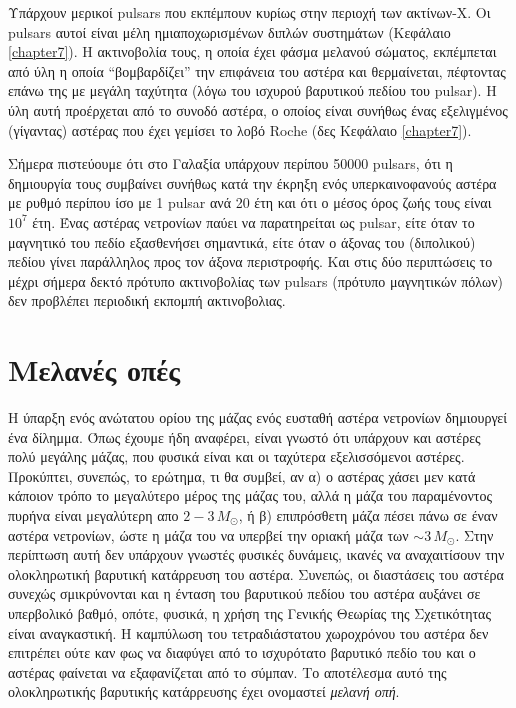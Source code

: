Υπάρχουν μερικοί pulsars που εκπέμπουν κυρίως στην περιοχή των ακτίνων-X. Οι pulsars αυτοί είναι μέλη ημιαποχωρισμένων διπλών συστημάτων (Κεφάλαιο \ref{chapter7}). Η ακτινοβολία τους, η οποία έχει φάσμα μελανού σώματος, εκπέμπεται από ύλη η οποία ``βομβαρδίζει'' την επιφάνεια του αστέρα και θερμαίνεται, πέφτοντας επάνω της με μεγάλη ταχύτητα (λόγω του ισχυρού βαρυτικού πεδίου του pulsar). Η ύλη αυτή προέρχεται από το συνοδό αστέρα, ο οποίος είναι συνήθως ένας εξελιγμένος (γίγαντας) αστέρας που έχει γεμίσει το λοβό Roche (δες Κεφάλαιο \ref{chapter7}).

Σήμερα πιστεύουμε ότι στο Γαλαξία υπάρχουν περίπου 50000 pulsars, ότι η δημιουργία τους συμβαίνει συνήθως κατά την έκρηξη ενός υπερκαινοφανούς αστέρα με ρυθμό περίπου ίσο με 1 pulsar ανά 20 έτη και ότι ο μέσος όρος ζωής τους είναι $10^7$ έτη. Ένας αστέρας νετρονίων παύει να παρατηρείται ως pulsar, είτε όταν το μαγνητικό του πεδίο εξασθενήσει σημαντικά, είτε όταν ο άξονας του (διπολικού) πεδίου γίνει παράλληλος προς τον άξονα περιστροφής. Και στις δύο περιπτώσεις το μέχρι σήμερα δεκτό πρότυπο ακτινοβολίας των pulsars (πρότυπο μαγνητικών πόλων) δεν προβλέπει περιοδική εκπομπή ακτινοβολιας.









\section{Μελανές οπές}
Η ύπαρξη ενός ανώτατου ορίου της μάζας ενός ευσταθή αστέρα νετρονίων δημιουργεί ένα δίλημμα. Όπως έχουμε ήδη αναφέρει, είναι γνωστό ότι υπάρχουν και αστέρες πολύ μεγάλης μάζας, που φυσικά είναι και οι ταχύτερα εξελισσόμενοι αστέρες. Προκύπτει, συνεπώς, το ερώτημα, τι θα συμβεί, αν α) ο αστέρας χάσει μεν κατά κάποιον τρόπο το μεγαλύτερο μέρος της μάζας του, αλλά η μάζα του παραμένοντος πυρήνα είναι μεγαλύτερη απο $2 - 3\,M_\odot$,  ή β) επιπρόσθετη μάζα πέσει πάνω σε έναν αστέρα νετρονίων, ώστε η μάζα του να υπερβεί την οριακή μάζα των $\sim 3\,M_\odot$. Στην περίπτωση αυτή δεν υπάρχουν γνωστές φυσικές δυνάμεις, ικανές να αναχαιτίσουν την ολοκληρωτική βαρυτική κατάρρευση του αστέρα. Συνεπώς, οι διαστάσεις του αστέρα συνεχώς σμικρύνονται και η ένταση του βαρυτικού πεδίου του αστέρα αυξάνει σε υπερβολικό βαθμό, οπότε, φυσικά, η χρήση της Γενικής Θεωρίας της Σχετικότητας είναι αναγκαστική. Η καμπύλωση του τετραδιάστατου χωροχρόνου του αστέρα δεν επιτρέπει ούτε καν φως να διαφύγει από το ισχυρότατο βαρυτικό πεδίο του και ο αστέρας φαίνεται να εξαφανίζεται από το σύμπαν. Το αποτέλεσμα αυτό της ολοκληρωτικής βαρυτικής κατάρρευσης έχει ονομαστεί \textit{μελανή οπή}.

